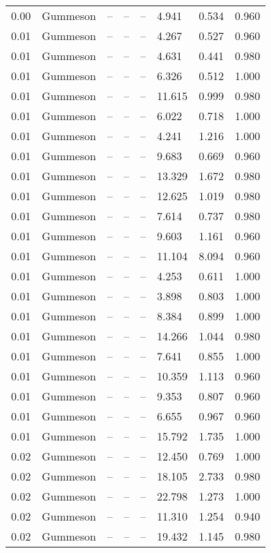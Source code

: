 \begin{table}[H]
\begin{tabular}{l c l l l}
0.00 & Gummeson & -- & -- & -- & 4.941 & 0.534 & 0.960 \\
0.01 & Gummeson & -- & -- & -- & 4.267 & 0.527 & 0.960 \\
0.01 & Gummeson & -- & -- & -- & 4.631 & 0.441 & 0.980 \\
0.01 & Gummeson & -- & -- & -- & 6.326 & 0.512 & 1.000 \\
0.01 & Gummeson & -- & -- & -- & 11.615 & 0.999 & 0.980 \\
0.01 & Gummeson & -- & -- & -- & 6.022 & 0.718 & 1.000 \\
0.01 & Gummeson & -- & -- & -- & 4.241 & 1.216 & 1.000 \\
0.01 & Gummeson & -- & -- & -- & 9.683 & 0.669 & 0.960 \\
0.01 & Gummeson & -- & -- & -- & 13.329 & 1.672 & 0.980 \\
0.01 & Gummeson & -- & -- & -- & 12.625 & 1.019 & 0.980 \\
0.01 & Gummeson & -- & -- & -- & 7.614 & 0.737 & 0.980 \\
0.01 & Gummeson & -- & -- & -- & 9.603 & 1.161 & 0.960 \\
0.01 & Gummeson & -- & -- & -- & 11.104 & 8.094 & 0.960 \\
0.01 & Gummeson & -- & -- & -- & 4.253 & 0.611 & 1.000 \\
0.01 & Gummeson & -- & -- & -- & 3.898 & 0.803 & 1.000 \\
0.01 & Gummeson & -- & -- & -- & 8.384 & 0.899 & 1.000 \\
0.01 & Gummeson & -- & -- & -- & 14.266 & 1.044 & 0.980 \\
0.01 & Gummeson & -- & -- & -- & 7.641 & 0.855 & 1.000 \\
0.01 & Gummeson & -- & -- & -- & 10.359 & 1.113 & 0.960 \\
0.01 & Gummeson & -- & -- & -- & 9.353 & 0.807 & 0.960 \\
0.01 & Gummeson & -- & -- & -- & 6.655 & 0.967 & 0.960 \\
0.01 & Gummeson & -- & -- & -- & 15.792 & 1.735 & 1.000 \\
0.02 & Gummeson & -- & -- & -- & 12.450 & 0.769 & 1.000 \\
0.02 & Gummeson & -- & -- & -- & 18.105 & 2.733 & 0.980 \\
0.02 & Gummeson & -- & -- & -- & 22.798 & 1.273 & 1.000 \\
0.02 & Gummeson & -- & -- & -- & 11.310 & 1.254 & 0.940 \\
0.02 & Gummeson & -- & -- & -- & 19.432 & 1.145 & 0.980 \\

\end{tabular}
\end{table}
